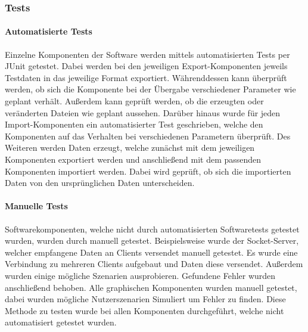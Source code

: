 \subsubsection{Tests}
\paragraph{Automatisierte Tests}
Einzelne Komponenten der Software werden mittels automatisierten Tests per JUnit getestet. Dabei werden bei den jeweiligen Export-Komponenten jeweils Testdaten in das jeweilige Format exportiert. Währenddessen kann überprüft werden, ob sich die Komponente bei der Übergabe verschiedener Parameter wie geplant verhält. Außerdem kann geprüft werden, ob die erzeugten oder veränderten Dateien wie geplant aussehen. Darüber hinaus wurde für jeden Import-Komponenten ein automatisierter Test geschrieben, welche den Komponenten auf das Verhalten bei verschiedenen Parametern überprüft. Des Weiteren werden Daten erzeugt, welche zunächst mit dem jeweiligen Komponenten exportiert werden und anschließend mit dem passenden Komponenten importiert werden. Dabei wird geprüft, ob sich die importierten Daten von den ursprünglichen Daten unterscheiden.

\paragraph{Manuelle Tests}
Softwarekomponenten, welche nicht durch automatisierten Softwaretests getestet wurden, wurden durch manuell getestet. Beispielsweise wurde der Socket-Server, welcher empfangene Daten an Clients versendet manuell getestet. Es wurde eine Verbindung zu mehreren Clients aufgebaut und Daten diese versendet. Außerdem wurden einige mögliche Szenarien ausprobieren. Gefundene Fehler wurden anschließend behoben. Alle graphischen Komponenten wurden manuell getestet, dabei wurden mögliche Nutzerszenarien Simuliert um Fehler zu finden. Diese Methode zu testen wurde bei allen Komponenten durchgeführt, welche nicht automatisiert getestet wurden.